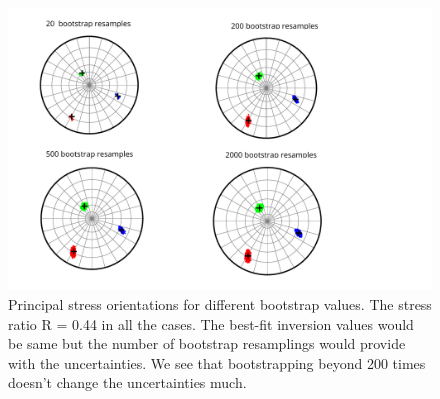 \documentclass[11pt]{article}
\begin{document}
\begin{figure}[!htb]
    \centering
    \includegraphics[scale=0.7]{bootstrap_uncert.pdf}
    \caption{Principal stress orientations for different bootstrap values. The stress ratio R = 0.44 in all the cases. The best-fit inversion values would be same but the number of bootstrap resamplings would provide with the uncertainties. We see that bootstrapping beyond 200 times doesn't change the uncertainties much.}
\end{figure}
\end{document}

